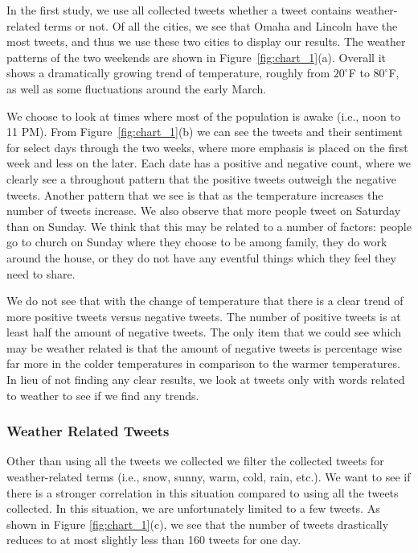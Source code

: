 In the first study, we use all collected tweets whether a tweet contains weather-related terms or not. Of all the cities, we see that Omaha and Lincoln have the most tweets, and thus we use these two cities to display our results. The weather patterns of the two weekends are shown in Figure~\ref{fig:chart_1}(a). Overall it shows a dramatically growing trend of temperature, roughly from $20^\circ$F to $80^\circ$F, as well as some fluctuations around the early March.

We choose to look at times where most of the population is awake (i.e., noon to 11 PM). From Figure~\ref{fig:chart_1}(b) we can see the tweets and their sentiment for select days through the two weeks, where more emphasis is placed on the first week and less on the later. Each date has a positive and negative count, where we clearly see a throughout pattern that the positive tweets outweigh the negative tweets. Another pattern that we see is that as the temperature increases the number of tweets increase. We also observe that more people tweet on Saturday than on Sunday. We think that this may be related to a number of factors: people go to church on Sunday where they choose to be among family, they do work around the house, or they do not have any eventful things which they feel they need to share.

We do not see that with the change of temperature that there is a clear trend of more positive tweets versus negative tweets. The number of positive tweets is at least half the amount of negative tweets. The only item that we could see which may be weather related is that the amount of negative tweets is percentage wise far more in the colder temperatures in comparison to the warmer temperatures. In lieu of not finding any clear results, we look at tweets only with words related to weather to see if we find any trends.


\subsubsection{Weather Related Tweets}

Other than using all the tweets we collected we filter the collected tweets for weather-related terms (i.e., snow, sunny, warm, cold, rain, etc.). We want to see if there is a stronger correlation in this situation compared to using all the tweets collected. In this situation, we are unfortunately limited to a few tweets. As shown in Figure \ref{fig:chart_1}(c), we see that the number of tweets drastically reduces to at most slightly less than 160 tweets for one day.

